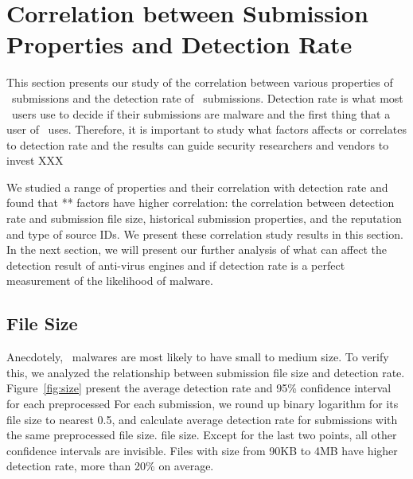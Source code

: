 \section{Correlation between Submission Properties and Detection Rate}
\label{sec:corr}
This section presents our study of the correlation between various properties of \pe\ submissions and the detection rate of \pe\ submissions.
Detection rate is what most \vt\ users use to decide if their submissions are malware 
and the first thing that a user of \vt\ uses.
Therefore, it is important to study what factors affects or correlates to detection rate
and the results can guide security researchers and vendors to invest XXX

We studied a range of properties and their correlation with detection rate
and found that ** factors have higher correlation:
the correlation between detection rate and submission file size,
historical submission properties, and the reputation and type of source IDs.
We present these correlation study results in this section.
In the next section, we will present our further analysis of what can affect the detection result of anti-virus engines
and if detection rate is a perfect measurement of the likelihood of malware.



\subsection{File Size}
\label{sec:size}
Anecdotely, \pe\ malwares are most likely to have small to medium size. 
To verify this, we analyzed the relationship between submission file size and detection rate. 
Figure~\ref{fig:size} present the average detection rate and 95\% confidence interval for each preprocessed 
For each submission, we round up binary logarithm for its file size to nearest 0.5,
and calculate average detection rate for submissions with the same preprocessed file size.
file size.
Except for the last two points, all other confidence intervals are invisible.   
Files with size from 90KB to 4MB have higher detection rate, more than 20\% on average. 

